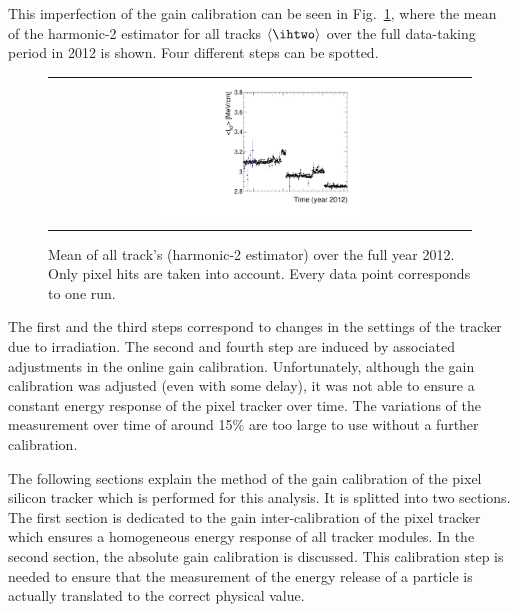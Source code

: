This imperfection of the gain calibration can be seen in Fig.~\ref{fig:StabilityPlot_beforeCalibration}, where the mean of the harmonic-2 estimator for all tracks $\langle\ihtwo \rangle$ over the full data-taking period in 2012 is shown.
Four different steps can be spotted.
\begin{figure}[!t]
  \centering 
  \begin{tabular}{c}
  \includegraphics[width=0.49\textwidth]{figures/analysis/PixelCalibration/StabilityPlot_Pixel_beforeCalibration_withoutStepFits_NEW.pdf}
  \end{tabular}
  \caption{Mean of all track's \dedx (harmonic-2 estimator) over the full year 2012. Only pixel hits are taken into account. Every data point corresponds to one run.} 
  \label{fig:StabilityPlot_beforeCalibration}
\end{figure}
The first and the third steps correspond to changes in the settings of the tracker due to irradiation.
The second and fourth step are induced by associated adjustments in the online gain calibration.
Unfortunately, although the gain calibration was adjusted (even with some delay), it was not able to ensure a constant energy response of the pixel tracker over time. 
The variations of the \dedx measurement over time of around 15\% are too large to use \dedx without a further calibration. 

The following sections explain the method of the gain calibration of the pixel silicon tracker which is performed for this analysis. 
It is splitted into two sections. 
The first section is dedicated to the gain inter-calibration of the pixel tracker which ensures a homogeneous energy response of all tracker modules.
In the second section, the absolute gain calibration is discussed. 
This calibration step is needed to ensure that the measurement of the energy release of a particle is actually translated to the correct physical value.



